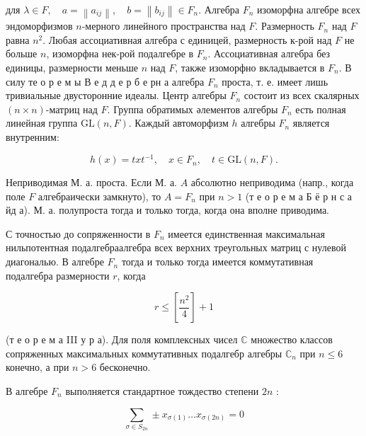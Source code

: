 \documentclass[10pt]{article}
\begin{document}
для $\lambda \in F, \quad a=\left\|a_{i j}\right\|, \quad b=\left\|b_{i j}\right\| \in F_{n}$. Алгебра $F_{n}$ изоморфна алгебре всех эндоморфизмов $n$-мерного линейного пространства над $F$. Размерность $F_{n}$ над $F$ равна $n^{2}$. Любая ассоциативная алгебра с единицей, размерность к-рой над $F$ не больше $n$, изоморфна нек-рой подалгебре в $F_{n}$. Ассоциативная алгебра без единицы, размерности меньше $n$ над $F$, также изоморфно вкладывается в $F_{n}$. В силу те о р е м ы В е д д е р б е рн а алгебра $F_{n}$ проста, т. е. имеет лишь тривиальные двусторонние идеалы. Центр алгебры $F_{n}$ состоит из всех скалярных $(n \times n)$-матриц над $F$. Группа обратимых әлементов алгебры $F_{n}$ есть полная линейная группа $\mathrm{GL}(n, F)$. Каждый автоморфизм $h$ алгебры $F_{n}$ является внутренним:



\[

h(x)=t x t^{-1}, \quad x \in F_{n}, \quad t \in \mathrm{GL}(n, F) .

\]



Неприводимая М. а. проста. Если М. а. $A$ абсолютно неприводима (напр., когда поле $F$ алгебраически замкнуто), то $A=F_{n}$ при $n>1$ (т е о р е м а Б ё р н с а йд а). М. а. полупроста тогда и только тогда, когда она вполне приводима.



С точностью до сопряженности в $F_{n}$ имеется единственная максимальная нильпотентная подалгебраалгебра всех верхних треугольных матриц с нулевой диагональю. В алгебре $F_{n}$ тогда и только тогда имеется коммутативная подалгебра размерности $r$, когда



\[

r \leqslant\left[\frac{n^{2}}{4}\right]+1

\]



(т е о р е м а III у р а). Для поля комплексных чисел $\mathbb{C}$ множество классов сопряженных максимальных коммутативных подалгебр алгебры $\mathbb{C}_{n}$ при $n \leqslant 6$ конечно, а при $n>6$ бесконечно.



В алгебре $F_{n}$ выполняется стандартное тождество степени $2 n$ :



\[

\sum_{\sigma \in S_{2 n}} \pm x_{\sigma(1)} \ldots x_{\sigma(2 n)}=0

\]
\end{document}
